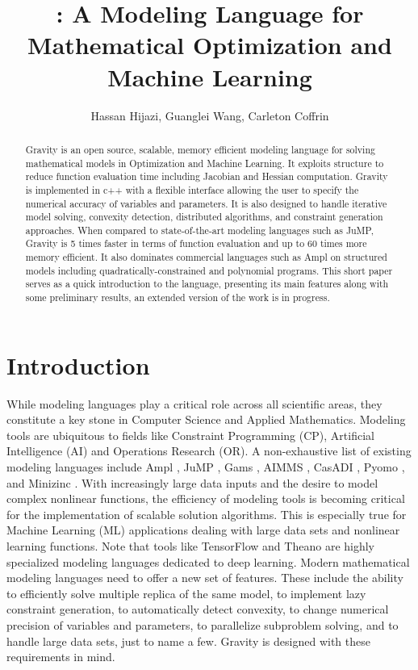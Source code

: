 \documentclass{article}
\title{\Gravity{}: A Modeling Language for Mathematical Optimization and \\Machine Learning}
\author{Hassan Hijazi\inst{*,1,2}, Guanglei Wang\inst{2}, Carleton Coffrin\inst{1}}
\institute{Los Alamos National Laboratory, Los Alamos, New Mexico, USA\\
${^*}$ corresponding author, \email{hlh@lanl.gov}\\
\and
The Australian National University, Canberra, ACT, Australia
}
\newcommand{\tensor}{{\sc TensorFlow}}
\newcommand{\theano}{{\sc Theano}}
\newcommand{\ampl}{{\sc Ampl}}
\newcommand{\casadi}{{\sc CasADI}}
\newcommand{\Gravity}{{\sc Gravity}}
\newcommand{\gams}{{\sc Gams}}
\newcommand{\aimms}{{\sc AIMMS}}
\newcommand{\minizinc}{{\sc Minizinc}}
\newcommand{\pyomo}{{\sc Pyomo}}
\newcommand{\jump}{{\sc JuMP}}
\begin{document}
\maketitle
\begin{abstract}
\Gravity{} is an open source, scalable, memory efficient modeling language for solving mathematical models in Optimization and Machine Learning. It exploits structure to reduce function evaluation time including Jacobian and Hessian computation. \Gravity{} is implemented in c++ with a flexible interface allowing the user to specify the numerical accuracy of variables and parameters. It is also designed to handle iterative model solving, convexity detection, distributed algorithms, and constraint generation approaches. 
When compared to state-of-the-art modeling languages such as \jump{}, \Gravity{} is 5 times faster in terms of function evaluation and up to 60 times more memory efficient. It also dominates commercial languages such as \ampl{} on structured models including quadratically-constrained and polynomial programs. This short paper serves as a quick introduction to the language, presenting its main features along with some preliminary results, an extended version of the work is in progress.
\end{abstract}

\section{Introduction}
While modeling languages play a critical role across all scientific areas, they constitute a key stone in Computer Science and Applied Mathematics. Modeling tools are ubiquitous to fields like Constraint Programming (CP), Artificial Intelligence (AI) and Operations Research (OR). A non-exhaustive list of existing modeling languages include \ampl{} \cite{ampl}, \jump{} \cite{DunningHuchetteLubin2017}, \gams{} \cite{gams}, \aimms{} \cite{aimms}, \casadi{} \cite{casadi}, \pyomo{} \cite{hart2011pyomo,hart2017pyomo}, and \minizinc{} \cite{minizinc}.
With increasingly large data inputs and the desire to model complex nonlinear functions, the efficiency of modeling tools is becoming critical for the implementation of scalable solution algorithms. This is especially true for Machine Learning (ML) applications dealing with large data sets and nonlinear learning functions. Note that tools like \tensor \cite{tensor} and \theano \cite{theano} are highly specialized modeling languages dedicated to deep learning. Modern mathematical modeling languages need to offer a new set of features. These include the ability to efficiently solve multiple replica of the same model, to implement lazy constraint generation, to automatically detect convexity, to change numerical precision of variables and parameters, to parallelize subproblem solving, and to handle large data sets, just to name a few. \Gravity{} is designed with these requirements in mind. 
\end{document}
